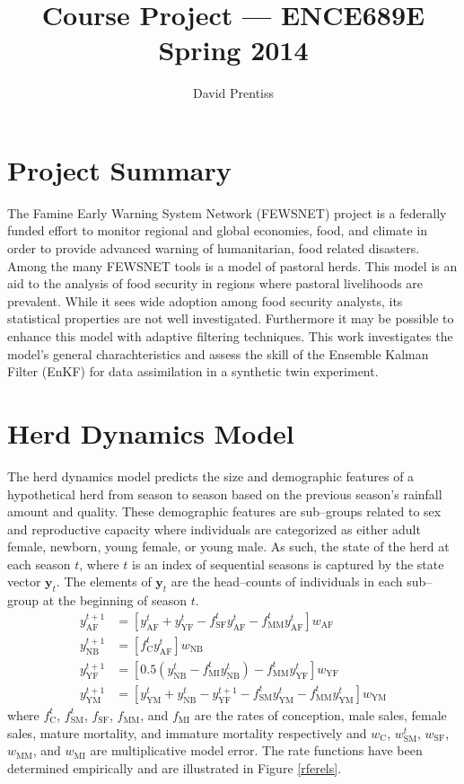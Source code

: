 \documentclass[fleqn, letterpaper]{article}
\title{Course Project --- ENCE689E Spring 2014}
\author{David Prentiss}
\numberwithin{figure}{section}
\newcommand{\vecy}{\mathbf{y}}
\begin{document}
\maketitle

\section{Project Summary}

The Famine Early Warning System Network (FEWSNET) project is a federally funded effort to monitor regional and global economies, food, and climate in order to provide advanced warning of humanitarian, food related disasters.
Among the many FEWSNET tools is a model of pastoral herds. This model\cite{fewsnet} is an aid to the analysis of food security in regions where pastoral livelihoods are prevalent. While it sees wide adoption among food security analysts, its statistical properties are not well investigated.
Furthermore it may be possible to enhance this model with adaptive filtering techniques.
This work investigates the model's general charachteristics and assess the skill of the Ensemble Kalman Filter (EnKF) for data assimilation in a synthetic twin experiment.

\section{Herd Dynamics Model}

The herd dynamics model predicts the size and demographic features of a hypothetical herd from season to season based on the previous season's rainfall amount and quality.
These demographic features are sub--groups related to sex and reproductive capacity where individuals are categorized as either adult female, newborn, young female, or young male.
As such, the state of the herd at each season $t$, where $t$ is an index of sequential seasons is captured by the state vector $\vecy_t$.
The elements of $\vecy_t$ are the head--counts of individuals in each sub--group at the beginning of season $t$.
\begin{align}
y_{\text{AF}}^{t+1} &= [y_{\text{AF}}^t + y_{\text{YF}}^t - f_{\text{SF}}^ty_{\text{AF}}^t - f_{\text{MM}}^ty_{\text{AF}}^t]w_{\text{AF}}\\
y_{\text{NB}}^{t+1} &= [f_{\text{C}}^ty_{\text{AF}}^t]w_{\text{NB}}\\
y_{\text{YF}}^{t+1} &= [0.5(y_{\text{NB}}^t - f_{\text{MI}}^ty_{\text{NB}}^t) - f_{\text{MM}}^ty_{\text{YF}}^t]w_{\text{YF}}\\
y_{\text{YM}}^{t+1} &= [y_{\text{YM}}^t + y_{\text{NB}}^t - y_{\text{YF}}^{t+1} - f_{\text{SM}}^ty_{\text{YM}}^t - f_{\text{MM}}^ty_{\text{YM}}^t]w_{\text{YM}}
\end{align}
where $f_{\text{C}}^t$, $f_{\text{SM}}^t$, $f_{\text{SF}}$, $f_{\text{MM}}$, and $f_{\text{MI}}$ are the rates of conception, male sales, female sales, mature mortality, and immature mortality respectively and
$w_{\text{C}}$, $w_{\text{SM}}^t$, $w_{\text{SF}}$, $w_{\text{MM}}$, and $w_{\text{MI}}$
are multiplicative model error.
The rate functions have been determined empirically and are illustrated in Figure \ref{rferels}.
\end{document}
